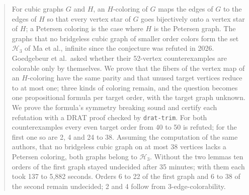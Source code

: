 \begin{abstract}
For cubic graphs $G$ and $H$, an $H$-coloring of $G$ maps the edges of $G$ to the edges of $H$ so
that every vertex star of $G$ goes bijectively onto a vertex star of $H$; a Petersen coloring is the
case where $H$ is the Petersen graph. The graphs that no bridgeless cubic graph of smaller order
colors form the set $\mathcal{H}_3$ of Ma et al., infinite since the
conjecture was refuted in 2026. Goedgebeur et al.\ asked whether their 52-vertex
counterexamples are colorable only by themselves. We prove that the fibers of the vertex map of an
$H$-coloring have the same parity and that unused target vertices reduce to at most one; three kinds of
coloring remain, and the question becomes one propositional formula per target order, with the
target graph unknown. We prove the formula's symmetry breaking sound and certify each
refutation with a DRAT proof checked by \texttt{drat-trim}. For both counterexamples every even
target order from 40 to 50 is refuted; for the first one so are 2, 4 and 24 to 38. Assuming the
computation of the same authors, that no bridgeless cubic graph on at most 38 vertices
lacks a Petersen coloring, both graphs belong to $\mathcal{H}_3$. Without the two lemmas ten orders
of the first graph stayed undecided after 35 minutes; with them each took 137 to 5,882 seconds. Orders 6
to 22 of the first graph and 6 to 38 of the second remain undecided; 2 and 4 follow from 3-edge-colorability.
\end{abstract}
